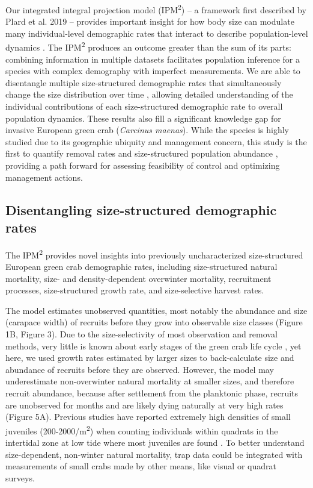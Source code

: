 \documentclass{article}
\begin{document}
Our integrated integral projection model (IPM\textsuperscript{2}) – a framework first described by Plard et al. 2019 – provides important insight for how body size can modulate many individual-level demographic rates that interact to describe population-level dynamics \parencite{plard2019ipm}. The IPM\textsuperscript{2} produces an outcome greater than the sum of its parts: combining information in multiple datasets facilitates population inference for a species with complex demography with imperfect measurements. We are able to disentangle multiple size-structured demographic rates that simultaneously change the size distribution over time \parencite{sogard1997size, carlson2010bayesian}, allowing detailed understanding of the individual contributions of each size-structured demographic rate to overall population dynamics. These results also fill a significant knowledge gap for invasive European green crab (\textit{Carcinus maenas}). While the species is highly studied due to its geographic ubiquity and management concern, this study is the first to quantify removal rates and size-structured population abundance \parencite{young2019life}, providing a path forward for assessing feasibility of control and optimizing management actions.

\subsection{Disentangling size-structured demographic rates}

The IPM\textsuperscript{2} provides novel insights into previously uncharacterized size-structured European green crab demographic rates, including size-structured natural mortality, size- and density-dependent overwinter mortality, recruitment processes, size-structured growth rate, and size-selective harvest rates. 

The model estimates unobserved quantities, most notably the abundance and size (carapace width) of recruits before they grow into observable size classes (Figure 1B, Figure 3). Due to the size-selectivity of most observation and removal methods, very little is known about early stages of the green crab life cycle \parencite{yamada2005growth}, yet here, we used growth rates estimated by larger sizes to back-calculate size and abundance of recruits before they are observed. However, the model may underestimate non-overwinter natural mortality at smaller sizes, and therefore recruit abundance, because after settlement from the planktonic phase, recruits are unobserved for months and are likely dying naturally at very high rates (Figure 5A). Previous studies have reported extremely high densities of small juveniles (200-2000/m\textsuperscript{2}) when counting individuals within quadrats in the intertidal zone at low tide where most juveniles are found \parencite{breteler1976settlement, thiel1994recruitment}. To better understand size-dependent, non-winter natural mortality, trap data could be integrated with measurements of small crabs made by other means, like visual or quadrat surveys.
\end{document}
